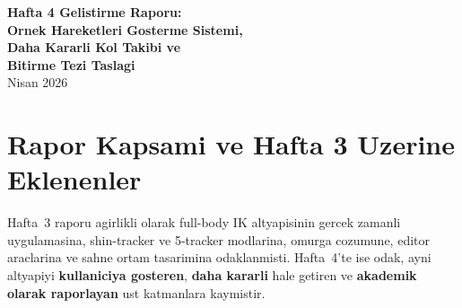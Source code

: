 \documentclass[11pt,a4paper]{article}
\begin{document}
\begin{center}
    {\LARGE\bfseries Hafta 4 Gelistirme Raporu:\\[4pt]
    \textcolor{demoblue}{Ornek Hareketleri Gosterme Sistemi},\\[4pt]
    \textcolor{armgreen}{Daha Kararli Kol Takibi} ve\\[4pt]
    \textcolor{thesisred}{Bitirme Tezi Taslagi}}\\[12pt]
    {\normalsize Nisan 2026}
\end{center}

\vspace{6pt}

\begin{abstract}
Bu rapor, proje gelisim surecinin dorduncu haftasinda tamamlanan uc ana
calismayi belgelemektedir. Ilk olarak, oyunlastirilmis tarama gorevleri icin
kullaniciya ornek hareketleri gosteren \textbf{ghost avatar tabanli demo sistemi}
tasarlanmis ve gorev tanimlariyla butunlestirilmistir. Ikinci olarak,
ust ekstremite izleme hattinda \textbf{omuz referans cercevesi},
\textbf{kalibrasyon tabanli goreli rotasyonlar} ve \textbf{avatar yansitma}
katmanlari tanimlanarak kol takibinin daha stabil ve tekrar edilebilir hale
gelmesi saglanmistir. Ucuncu olarak, projenin akademik teslimi icin
\textbf{bitirme tezi taslagi} universite formatina uygun bicimde yazilmistir.
Bu uc ciktinin ortak amaci; sistemin teknik olgunlugunu, kullanici
yonlendirme kapasitesini ve akademik raporlanabilirligini ayni anda ileri
tasimaktir.
\end{abstract}

\tableofcontents
\vspace{8pt}

\section{Rapor Kapsami ve Hafta 3 Uzerine Eklenenler}
\label{sec:kapsam}

Hafta~3 raporu agirlikli olarak full-body IK altyapisinin gercek zamanli
uygulamasina, shin-tracker ve 5-tracker modlarina, omurga cozumune,
editor araclarina ve sahne ortam tasarimina odaklanmisti. Hafta~4'te ise
odak, ayni altyapiyi \textbf{kullaniciya gosteren}, \textbf{daha kararli}
hale getiren ve \textbf{akademik olarak raporlayan} ust katmanlara kaymistir.
\end{document}
